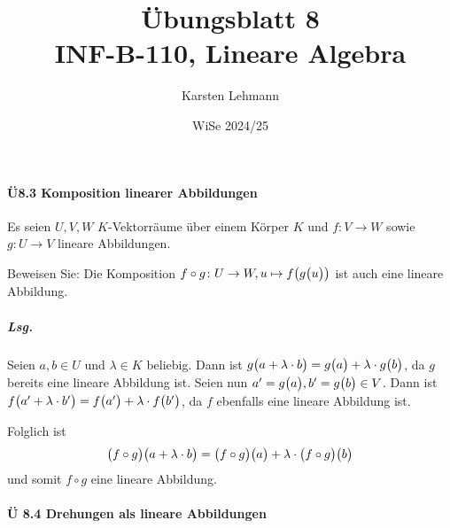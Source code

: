 \documentclass{scrreprt}
\author{Karsten Lehmann}
\date{WiSe 2024/25}
\title{Übungsblatt 8\\INF-B-110, Lineare Algebra}
\begin{document}
\paragraph{Ü8.3 Komposition linearer Abbildungen}

Es seien $U, V, W$ $K$-Vektorräume über einem Körper $K$ und $f \colon V \to W$
sowie $g \colon U \to V$ lineare Abbildungen.

Beweisen Sie: Die Komposition
$f \circ g \colon U \to W, u \mapsto f\qty(g\qty\big(u))$ ist auch eine
lineare Abbildung.

\subparagraph{Lsg.} Seien $a, b \in U$ und $\lambda \in K$ beliebig.
Dann ist
$g\qty\big(a + \lambda \cdot b) = g\qty\big(a) + \lambda \cdot g\qty\big(b)$, da
$g$ bereits eine lineare Abbildung ist.
Seien nun $a' = g\qty\big(a), b' = g\qty\big(b) \in V$.
Dann ist
$f\qty\big(a' + \lambda \cdot b') = f\qty\big(a') + \lambda \cdot f\qty\big(b')$,
da $f$ ebenfalls eine lineare Abbildung ist.

Folglich ist
\[
  \qty\big(f \circ g)\qty\big(a + \lambda \cdot b) =
  \qty\big(f \circ g)\qty\big(a) + \lambda \cdot \qty\big(f \circ g)\qty\big(b)
\]
und somit $f \circ g$ eine lineare Abbildung.


\paragraph{Ü 8.4 Drehungen als lineare Abbildungen}
\end{document}
